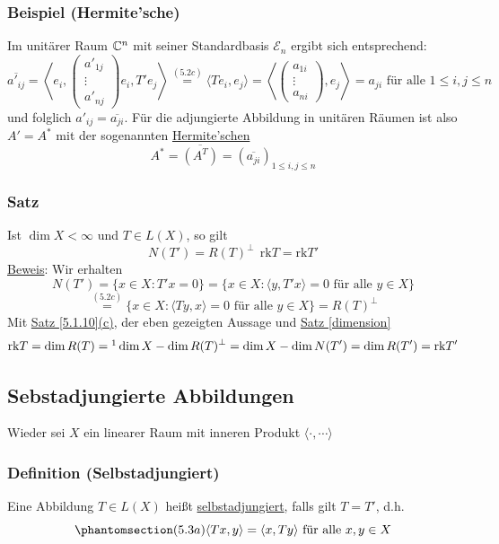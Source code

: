 \subsubsection{Beispiel (Hermite'sche)}
\label{5.2.5}
Im unitärer Raum $\mathbb{C} ^n$ mit seiner Standardbasis $\mathcal{E}_n$ ergibt sich entsprechend:
\[\overline{a'_{ij}}=\left\langle e_i,\begin{pmatrix}a'_{1j}\\ \vdots \\ a'_{nj}\end{pmatrix} e_i,T'e_j\right\rangle \stackrel{\hyperref[5.2c]{(5.2c)}}{=}\langle Te_i,e_j\rangle = \left\langle \begin{pmatrix}a_{1i}\\ \vdots \\ a_{ni}\end{pmatrix},e_j\right\rangle=a_{ji}\text{ für alle } 1\leq i,j\leq n\]
und folglich $a'_{ij}=\overline{a_{ji}}$.  Für die adjungierte Abbildung in unitären Räumen ist also $A'=A^*$ mit der sogenannten \underline{Hermite'schen}
\[A^*=\overline{(A^T)}=(\overline{a_{ji}})_{1\leq i,j\leq n}\]
\subsubsection{Satz}
Ist $\dim X<\infty$ und $T\in L(X)$, so gilt
\[N(T')=R(T)^\bot\ \ \mathrm{rk}T=\mathrm{rk}T'\]
\underline{Beweis}: Wir erhalten
\[N(T')=\{x\in X\colon T'x=0\}=\{x\in X\colon \langle y, T'x\rangle =0\text{ für alle }y\in X\}\]
\[\stackrel{\hyperref[5.2c]{(5.2c)}}{=}\{x\in X\colon \langle Ty,x\rangle =0\text{ für alle } y\in X\}=R(T)^\bot\]
Mit \hyperref[5.1.10]{Satz \ref{5.1.10}(c)}, der eben gezeigten Aussage und \hyperref[dimension]{Satz \ref{dimension}}
\[\mathrm{rk}T=\dim R(T)=\footnotemark\dim X-\dim R(T)^\bot =\dim  X-\dim N(T')=\dim R(T')=\mathrm{rk}T'\]
\subsection{Sebstadjungierte Abbildungen}
Wieder sei $X$ ein linearer Raum mit inneren Produkt $\langle \cdot ,\cdots \rangle$
\subsubsection{Definition (Selbstadjungiert)}
Eine Abbildung $T\in L(X)$ heißt \underline{selbstadjungiert}, falls gilt $T=T'$, d.h.
\[\phantomsection\label{5.3a}(5.3a)\langle Tx,y\rangle =\langle x,Ty\rangle \text{ für alle }x,y\in X\]
